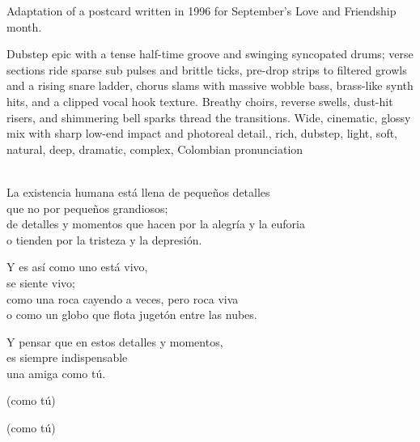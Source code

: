 

\begin{notes}
Adaptation of a postcard written in 1996 for September's Love and Friendship month.
\end{notes}
\begin{style}
Dubstep epic with a tense half-time groove and swinging syncopated drums; verse sections ride sparse sub pulses and brittle ticks, pre-drop strips to filtered growls and a rising snare ladder, chorus slams with massive wobble bass, brass-like synth hits, and a clipped vocal hook texture. %
Breathy choirs, reverse swells, dust-hit risers, and shimmering bell sparks thread the transitions. %
Wide, cinematic, glossy mix with sharp low-end impact and photoreal detail., rich, dubstep, light, soft, natural, deep, dramatic, complex, Colombian pronunciation
\end{style}
\begin{lyrics}

\\
La existencia humana está llena de pequeños detalles\\
que no por pequeños grandiosos;\\
de detalles y momentos que hacen por la alegría y la euforia\\
o tienden por la tristeza y la depresión.

Y es así como uno está vivo,\\
se siente vivo;\\
como una roca cayendo a veces, pero roca viva\\
o como un globo que flota jugetón entre las nubes.

Y pensar que en estos detalles y momentos,\\
es siempre indispensable\\
una amiga como tú.

(como tú)

(como tú)
\end{lyrics}
